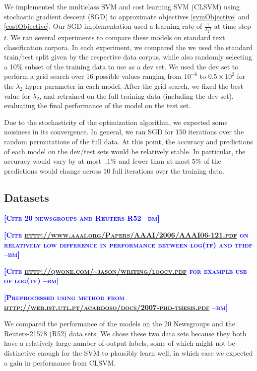\documentclass{article} %
\newcommand{\bmcomment}[1]{\textcolor{blue}{\textsc{\textbf{[#1 --bm]}}}}
\begin{document}
We implemented the multiclass SVM and cost learning SVM (CLSVM) 
using stochastic gradient descent (SGD) to approximate objectives
\ref{svmObjective} and \ref{costObjective}.  Our SGD implementation
used a learning rate of $\frac{1}{\lambda_2 t}$ at time-step $t$.
We ran several experiments to compare these models on standard
text classification corpora.  In each experiment, we compared 
the we used the standard train/test split given by the respective
data corpus, while also randomly selecting a 10\% subset of the 
training data to use as a dev set.  We used the dev set to perform
a grid search over 16 possible values ranging from $10^{-6}$ to 
$0.5\times 10^2$ for the $\lambda_2$ hyper-parameter in each model.
After the grid search, we fixed the best value for $\lambda_2$,
and retrained on the full training data (including the dev set),
evaluating the final performance of the model on the test set.  
 
Due to the stochasticity of the optimization algorithm, we 
expected some noisiness in its convergence.  In general, we 
ran SGD for 150 iterations over the random permutations
of the full data. At this point, the accuracy and predictions 
of each model on the dev/test sets would be relatively stable.
In particular, the accuracy would vary by at most $~.1\%$ and 
fewer than at most $5\%$ of the predictions would change 
across 10 full iterations over the training data. 

\subsection{Datasets}

\bmcomment{Cite 20 newsgroups and Reuters R52}

\bmcomment{Cite \url{http://www.aaai.org/Papers/AAAI/2006/AAAI06-121.pdf}
on relatively low difference in performance between log(tf) and tfidf}

\bmcomment{Cite \url{http://qwone.com/~jason/writing/loocv.pdf} for 
example use of log(tf)}

\bmcomment{Preprocessed using method from 
\url{http://web.ist.utl.pt/acardoso/docs/2007-phd-thesis.pdf}}

We compared the performance of the models on the 20 Newsgroups and
the Reuters-21578 (R52) data sets.  We chose these two data sets
because they both have a relatively large number of output labels,
some of which might not be distinctive enough for the SVM to plausibly
learn well, in which case we expected a gain in performance from
CLSVM.
\end{document}
